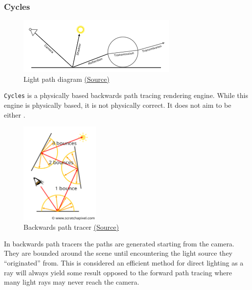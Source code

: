\documentclass[11pt]{article}
\begin{document}
\subsubsection{Cycles}
\label{sec:orgc06bc46}
\begin{figure}[htbp]
\centering
\includegraphics[width=0.7\textwidth]{Images/render_cycles_render-settings_light-paths_rays.png}
\caption{\label{light-path}Light path diagram \href{https://docs.blender.org/manual/en/latest/render/cycles/render\_settings/light\_paths.html}{(Source)}}
\end{figure}
\texttt{Cycles} is a physically based backwards path tracing rendering engine. While
this engine is  physically based, it is not physically correct. It does not aim
to be either \cite{design-goals}.\\

\newpage
\begin{figure}
\centering
\includegraphics[width=0.35\textwidth]{Images/shad2-globalillum1a.png}
\caption{Backwards path tracer \href{https://www.scratchapixel.com/lessons/3d-basic-rendering/global-illumination-path-tracing}{(Source)}}
\end{figure}
In backwards path tracers the paths are generated starting from the camera. They
are bounded around the scene until encountering the light source they ``originated'' from.
This is considered an efficient method for direct lighting as a ray will always
yield some result opposed to the forward path tracing where many light rays may
never reach the camera.\\
\end{document}
